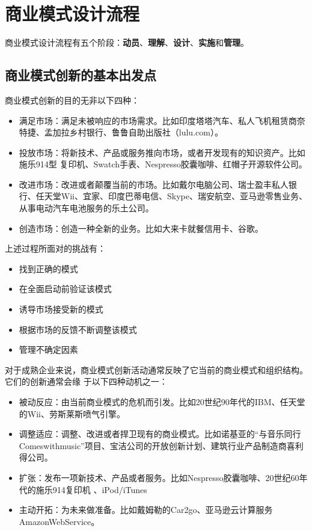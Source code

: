 \section{商业模式设计流程}

商业模式设计流程有五个阶段：\textbf{动员}、\textbf{理解}、\textbf{设计}、\textbf{实施}和\textbf{管理}。

\subsection{商业模式创新的基本出发点}

商业模式创新的目的无非以下四种：
\begin{itemize}
    \item 满足市场：满足未被响应的市场需求。比如印度塔塔汽车、私人飞机租赁商奈特捷、孟加拉乡村银行、鲁鲁自助出版社（lulu.com）。
    \item 投放市场：将新技术、产品或服务推向市场，或者开发现有的知识资产。比如施乐914型 复印机、Swatch手表、Nespresso胶囊咖啡、红帽子开源软件公司。
    \item 改进市场：改进或者颠覆当前的市场。比如戴尔电脑公司、瑞士盈丰私人银行、任天堂Wii、宜家、印度巴蒂电信、Skype、瑞安航空、亚马逊零售业务、从事电动汽车电池服务的乐土公司。
    \item 创造市场：创造一种全新的业务。比如大来卡就餐信用卡、谷歌。
\end{itemize}

上述过程所面对的挑战有：
\begin{itemize}
    \item 找到正确的模式
    \item 在全面启动前验证该模式
    \item 诱导市场接受新的模式
    \item 根据市场的反馈不断调整该模式
    \item 管理不确定因素
\end{itemize}

对于成熟企业来说，商业模式创新活动通常反映了它当前的商业模式和组织结构。它们的创新通常会缘 于以下四种动机之一：
\begin{itemize}
    \item 被动反应：由当前商业模式的危机而引发。比如20世纪90年代的IBM、任天堂的Wii、劳斯莱斯喷气引擎。
    \item 调整适应：调整、改进或者捍卫现有的商业模式。比如诺基亚的“与音乐同行Comeswithmusic”项目、宝洁公司的开放创新计划、建筑行业产品制造商喜利得公司。
    \item 扩张：发布一项新技术、产品或者服务。比如Nespresso胶囊咖啡、20世纪60年代的施乐914复印机 、iPod/iTunes
    \item 主动开拓：为未来做准备。比如戴姆勒的Car2go、亚马逊云计算服务AmazonWebService。
\end{itemize}


